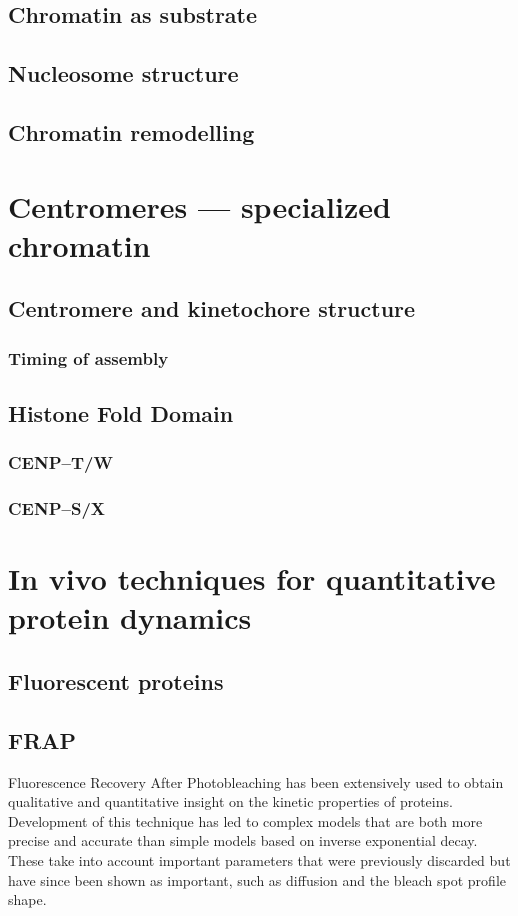   \subsection{Chromatin as substrate}
  \subsection{Nucleosome structure}
  \subsection{Chromatin remodelling}

\section{Centromeres --- specialized chromatin}
  \subsection{Centromere and kinetochore structure}
    \subsubsection{Timing of assembly}
  \subsection{Histone Fold Domain}
    \subsubsection{CENP--T/W}
    \subsubsection{CENP--S/X}

\section{In vivo techniques for quantitative protein dynamics}
  \subsection{Fluorescent proteins}
  \subsection{FRAP}

    Fluorescence Recovery After Photobleaching has been extensively used to obtain
    qualitative and quantitative insight on the kinetic properties of proteins. Development of
    this technique has led to complex models that are both more precise and accurate than
    simple models based on inverse exponential decay. These take into account important
    parameters that were previously discarded but have since been shown as important, such as
    diffusion and the bleach spot profile shape.

